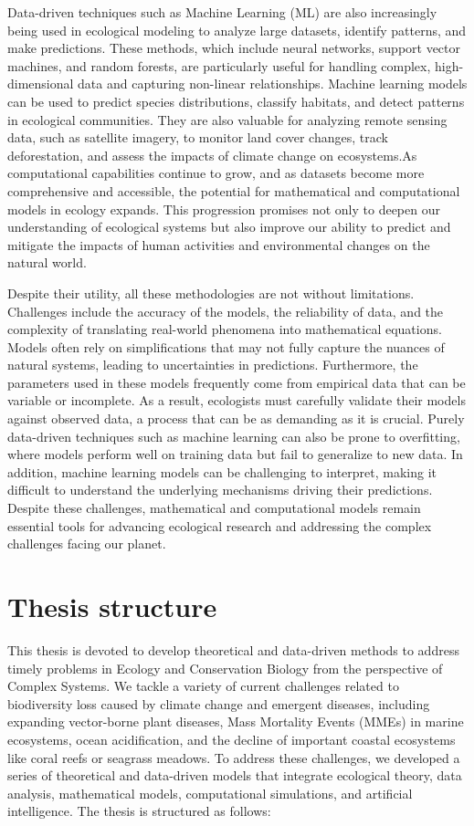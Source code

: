Data-driven techniques such as Machine Learning (ML) are also increasingly
being used in ecological modeling to analyze large datasets, identify patterns,
and make predictions. These methods, which include neural networks, support
vector machines, and random forests, are particularly useful for handling
complex, high-dimensional data and capturing non-linear relationships. Machine
learning models can be used to predict species distributions, classify
habitats, and detect patterns in ecological communities. They are also valuable
for analyzing remote sensing data, such as satellite imagery, to monitor land
cover changes, track
deforestation, and assess the impacts of climate change on ecosystems.As
computational capabilities continue to grow, and as datasets become more
comprehensive and accessible, the potential for mathematical and computational
models in ecology expands. This progression promises not only to deepen our
understanding of ecological systems but also improve our ability to predict and
mitigate the impacts of human activities and environmental changes on the
natural world.

Despite their utility, all these methodologies are not without limitations.
Challenges include the accuracy of the models, the reliability of data, and the
complexity of translating real-world phenomena into mathematical equations.
Models often rely on simplifications that may not fully capture the nuances of
natural systems, leading to uncertainties in predictions. Furthermore, the
parameters used in these models frequently come from empirical data that can be
variable or incomplete. As a result, ecologists must carefully validate their
models against observed data, a process that can be as demanding as it is
crucial. Purely data-driven techniques such as machine learning can also be
prone to overfitting, where models perform well on training data but fail to
generalize to new data. In addition,  machine learning models can be
challenging to interpret, making it difficult to understand the underlying
mechanisms driving their predictions. Despite these challenges, mathematical
and computational models remain essential tools for advancing ecological
research and addressing the complex challenges facing our planet.

\section{\label{sec:Thesis structure} Thesis structure}

This thesis is devoted to develop theoretical and data-driven methods to
address timely problems in Ecology and Conservation Biology from the
perspective of Complex Systems. We tackle a variety of current challenges
related to biodiversity loss caused by climate change and emergent diseases,
including expanding vector-borne plant diseases, Mass Mortality Events (MMEs)
in marine ecosystems, ocean acidification, and the decline of important coastal
ecosystems like coral reefs or seagrass meadows. To address these challenges,
we developed a series of theoretical and data-driven models that integrate
ecological theory, data analysis, mathematical models, computational
simulations, and artificial intelligence. The thesis is structured as follows:
